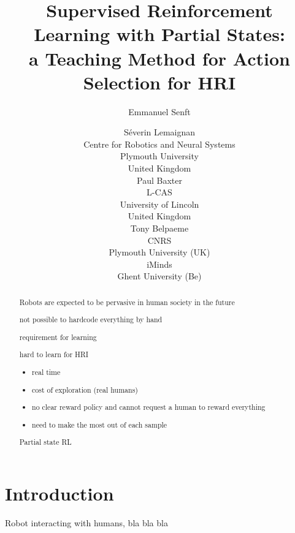 \documentclass[letterpaper]{article} %
\begin{document}
%
\title{Supervised Reinforcement Learning with Partial States: \\
 a Teaching Method for Action Selection for HRI}

\author{Emmanuel Senft \and S\'{e}verin Lemaignan\\
Centre for Robotics and Neural Systems \\
Plymouth University \\
United Kingdom\\
\And Paul Baxter\\
L-CAS\\
University of Lincoln\\
United Kingdom\\
 \And Tony Belpaeme\\
 CNRS\\ Plymouth University (UK) \\ iMinds \\ Ghent University (Be)}

\maketitle
\begin{abstract}
Robots are expected to be pervasive in human society in the future

not possible to hardcode everything by hand

requirement for learning

hard to learn for HRI
\begin{itemize}
	\item real time
	\item cost of exploration (real humans)
	\item no clear reward policy and cannot request a human to reward everything
	\item need to make the most out of each sample
\end{itemize}

Partial state RL


\end{abstract}

\section{Introduction}

Robot interacting with humans, bla bla bla
\end{document}
